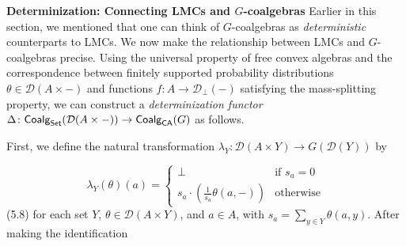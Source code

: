 \par\medskip
\hypertarget{html:S5.SS0.SSS0.Px2}{} \par\noindent\textbf{Determinization: Connecting LMCs and %
\hypertarget{html:S5.SS0.SSS0.Px2.m1}{}\({G}\)-coalgebras}\quad  %
\hypertarget{html:S5.SS0.SSS0.Px2.p1}{} Earlier in this section, we mentioned that one can think of %
\hypertarget{html:S5.SS0.SSS0.Px2.p1.m1}{}\({G}\)-coalgebras as \emph{deterministic} counterparts to LMCs. We now make the relationship between LMCs and %
\hypertarget{html:S5.SS0.SSS0.Px2.p1.m2}{}\({G}\)-coalgebras precise. Using the universal property of free convex algebras and the correspondence between finitely supported probability distributions %
\hypertarget{html:S5.SS0.SSS0.Px2.p1.m3}{}\({\theta\in{\mathcal{D}}(A\times-)}\) and functions %
\hypertarget{html:S5.SS0.SSS0.Px2.p1.m4}{}\({f\colon A\to{\mathcal{D}}_{\bot}(-)}\) satisfying the mass-splitting property, we can construct a \emph{determinization functor} %
\hypertarget{html:S5.SS0.SSS0.Px2.p1.m5}{}\({\Delta\colon\mbox{\sf Coalg}_{\mathsf{Set}}({\mathcal{D}}(A\times-))\to\mbox{\sf Coalg}_{\mathsf{CA}}(G)}\) as follows.
\par\medskip
\hypertarget{html:S5.SS0.SSS0.Px2.p2}{} First, we define the natural transformation %
\hypertarget{html:S5.SS0.SSS0.Px2.p2.m1}{}\({\lambda_{Y}:{\mathcal{D}}(A\times Y)\to G({\mathcal{D}}(Y))}\) by
\par\medskip
\hypertarget{html:S5.E8}{}   %
\hypertarget{html:S5.E8.m1}{}\[\lambda_{Y}(\theta)(a)=\begin{cases}\bot&\mbox{if $s_{a}=0$}\\
s_{a}\cdot(\frac{1}{s_{a}}\theta(a,-))&\mbox{otherwise}\end{cases}\]  (5.8)   for each set %
\hypertarget{html:S5.SS0.SSS0.Px2.p2.m2}{}\({Y}\), %
\hypertarget{html:S5.SS0.SSS0.Px2.p2.m3}{}\({\theta\in{\mathcal{D}}(A\times Y)}\), and %
\hypertarget{html:S5.SS0.SSS0.Px2.p2.m4}{}\({a\in A}\), with %
\hypertarget{html:S5.SS0.SSS0.Px2.p2.m5}{}\({s_{a}=\sum_{y\in Y}\theta(a,y)}\). After making the identification %

